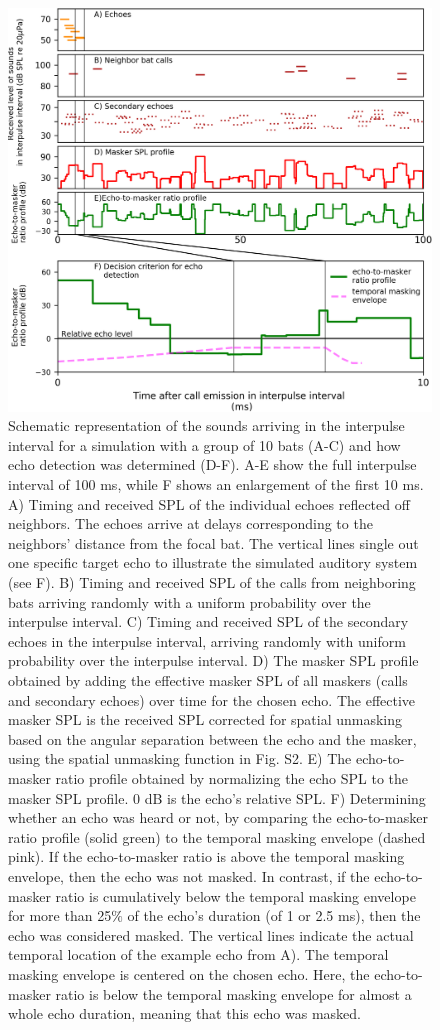 \documentclass[
]{book}
\begin{document}
\begin{figure}
\includegraphics[]{original_papers/CPN_figures/Figures_SI/Figure_S5.png}
\centering
\caption[caption1]{Schematic representation of the sounds arriving in the interpulse interval for a simulation with a group of 10 bats (A-C) and how echo detection was determined (D-F). A-E show the full interpulse interval of 100 ms, while F shows an enlargement of the first 10 ms.  A) Timing and received SPL of the individual echoes reflected off neighbors. The echoes arrive at delays corresponding to the neighbors’ distance from the focal bat. The vertical lines single out one specific target echo to illustrate the simulated auditory system (see F). B) Timing and received SPL of the calls from neighboring bats arriving randomly with a uniform probability over the interpulse interval. C) Timing and received SPL of the secondary echoes in the interpulse interval, arriving randomly with uniform probability over the interpulse interval. D) The masker SPL profile obtained by adding the effective masker SPL of all maskers (calls and secondary echoes) over time for the chosen echo. The effective masker SPL is the received SPL corrected for spatial unmasking based on the angular separation between the echo and the masker, using the spatial unmasking function in Fig. S2. E) The echo-to-masker ratio profile obtained by normalizing the echo SPL to the masker SPL profile. 0 dB is the echo's relative SPL. F) Determining whether an echo was heard or not, by comparing the echo-to-masker ratio profile (solid green) to the temporal masking envelope (dashed pink). If the echo-to-masker ratio is above the temporal masking envelope, then the echo was not masked. In contrast, if the echo-to-masker ratio is cumulatively below the temporal masking envelope for more than 25$\%$ of the echo's duration (of 1 or 2.5 ms), then the echo was considered masked. The vertical lines indicate the actual temporal location of the example echo from A). The temporal masking envelope is centered on the chosen echo. Here, the echo-to-masker ratio is below the temporal masking envelope for almost a whole echo duration, meaning that this echo was masked.
}
\end{figure}
\end{document}
